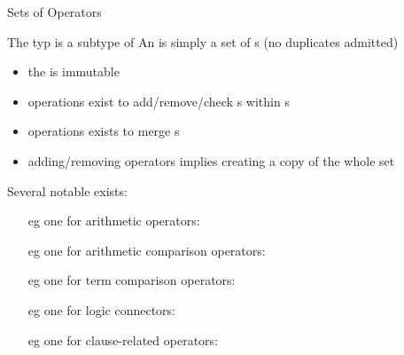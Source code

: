 \documentclass[handout]{beamer}
\begin{document}
\begin{frame}[allowframebreaks]{Sets of Operators}
    \begin{block}{The  typ is a subtype of }
        An  is simply a set of s (no duplicates admitted)
        \begin{itemize}
            \item the  is \alert{immutable}
            \item operations exist to add/remove/check s within s
            \item operations exists to \alert{merge} s
            \item adding/removing operators implies \alert{creating a copy} of the whole set
        \end{itemize}
    \end{block}

    \framebreak

    Several notable  exists:
    \begin{itemize}
        \item[eg] one for arithmetic operators:
            \\\medskip

        \framebreak

        \item[eg] one for arithmetic comparison operators:
            \\\medskip

        \framebreak

        \item[eg] one for term comparison operators:
            \\\medskip

        \framebreak

        \item[eg] one for logic connectors:
            \\\medskip

        \framebreak

        \item[eg] one for clause-related operators:
            \\\medskip

        \framebreak


\end{itemize}
\end{frame}
\end{document}
